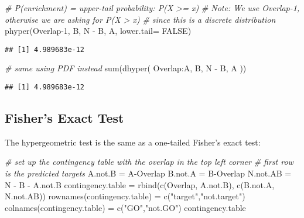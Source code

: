 \documentclass[
]{article}
\newenvironment{Shaded}{\begin{snugshade}}{\end{snugshade}}
\newcommand{\AttributeTok}[1]{\textcolor[rgb]{0.77,0.63,0.00}{#1}}
\newcommand{\CommentTok}[1]{\textcolor[rgb]{0.56,0.35,0.01}{\textit{#1}}}
\newcommand{\ConstantTok}[1]{\textcolor[rgb]{0.00,0.00,0.00}{#1}}
\newcommand{\DecValTok}[1]{\textcolor[rgb]{0.00,0.00,0.81}{#1}}
\newcommand{\FunctionTok}[1]{\textcolor[rgb]{0.00,0.00,0.00}{#1}}
\newcommand{\NormalTok}[1]{#1}
\newcommand{\OtherTok}[1]{\textcolor[rgb]{0.56,0.35,0.01}{#1}}
\newcommand{\SpecialCharTok}[1]{\textcolor[rgb]{0.00,0.00,0.00}{#1}}
\newcommand{\StringTok}[1]{\textcolor[rgb]{0.31,0.60,0.02}{#1}}
\begin{document}
\begin{Shaded}
\begin{Highlighting}[]
\CommentTok{\# P(enrichment) = upper{-}tail probability: P(X \textgreater{}= x)}
\CommentTok{\# Note: We use Overlap{-}1, otherwise we are asking for P(X \textgreater{} x)}
\CommentTok{\#       since this is a discrete distribution}
\FunctionTok{phyper}\NormalTok{(Overlap}\DecValTok{{-}1}\NormalTok{, B, N }\SpecialCharTok{{-}}\NormalTok{ B, A, }\AttributeTok{lower.tail=} \ConstantTok{FALSE}\NormalTok{)}
\end{Highlighting}
\end{Shaded}

\begin{verbatim}
## [1] 4.989683e-12
\end{verbatim}

\begin{Shaded}
\begin{Highlighting}[]
\CommentTok{\# same using PDF instead}
\FunctionTok{sum}\NormalTok{(}\FunctionTok{dhyper}\NormalTok{( Overlap}\SpecialCharTok{:}\NormalTok{A, B, N }\SpecialCharTok{{-}}\NormalTok{ B, A ))}
\end{Highlighting}
\end{Shaded}

\begin{verbatim}
## [1] 4.989683e-12
\end{verbatim}

\hypertarget{fishers-exact-test}{%
\subsection{Fisher's Exact Test}\label{fishers-exact-test}}

The hypergeometric test is the same as a one-tailed Fisher's exact test:

\begin{Shaded}
\begin{Highlighting}[]
\CommentTok{\# set up the contingency table with the overlap in the top left corner}
\CommentTok{\# first row is the predicted targets}
\NormalTok{A.not.B }\OtherTok{=}\NormalTok{ A}\SpecialCharTok{{-}}\NormalTok{Overlap}
\NormalTok{B.not.A }\OtherTok{=}\NormalTok{ B}\SpecialCharTok{{-}}\NormalTok{Overlap}
\NormalTok{N.not.AB }\OtherTok{=}\NormalTok{ N }\SpecialCharTok{{-}}\NormalTok{ B }\SpecialCharTok{{-}}\NormalTok{ A.not.B}
\NormalTok{contingency.table }\OtherTok{=} \FunctionTok{rbind}\NormalTok{(}\FunctionTok{c}\NormalTok{(Overlap, A.not.B),}
                          \FunctionTok{c}\NormalTok{(B.not.A, N.not.AB))}
\FunctionTok{rownames}\NormalTok{(contingency.table) }\OtherTok{=} \FunctionTok{c}\NormalTok{(}\StringTok{"target"}\NormalTok{,}\StringTok{"not.target"}\NormalTok{)}
\FunctionTok{colnames}\NormalTok{(contingency.table) }\OtherTok{=} \FunctionTok{c}\NormalTok{(}\StringTok{"GO"}\NormalTok{,}\StringTok{"not.GO"}\NormalTok{)}
\NormalTok{contingency.table}
\end{Highlighting}
\end{Shaded}
\end{document}
